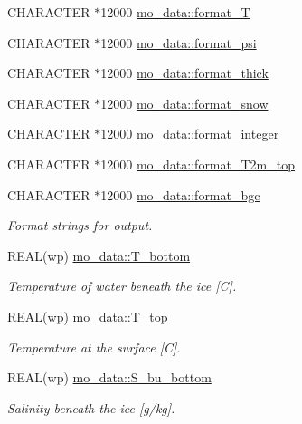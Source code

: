 \begin{DoxyCompactItemize}
CHARACTER $\ast$12000 \hyperlink{namespacemo__data_abe2cc97e4da609edede5040d2574b93f}{mo\_\-data::format\_\-T}
\item 
CHARACTER $\ast$12000 \hyperlink{namespacemo__data_a5a4d1d7b7cad308de5f2a051715e95d5}{mo\_\-data::format\_\-psi}
\item 
CHARACTER $\ast$12000 \hyperlink{namespacemo__data_acb2cd425e31735f68ad118da5eed1392}{mo\_\-data::format\_\-thick}
\item 
CHARACTER $\ast$12000 \hyperlink{namespacemo__data_ad94f3b5a63bb78de820fe5a8c6f5574c}{mo\_\-data::format\_\-snow}
\item 
CHARACTER $\ast$12000 \hyperlink{namespacemo__data_a6e3f24460d266c05576103895a7167be}{mo\_\-data::format\_\-integer}
\item 
CHARACTER $\ast$12000 \hyperlink{namespacemo__data_a15b8dd299b9b9a34d337f74ea3e8b676}{mo\_\-data::format\_\-T2m\_\-top}
\item 
CHARACTER $\ast$12000 \hyperlink{namespacemo__data_ac2bdb68249acc513c69fb2793f6f376c}{mo\_\-data::format\_\-bgc}
\begin{DoxyCompactList}\small\item\em Format strings for output. \item\end{DoxyCompactList}\item 
REAL(wp) \hyperlink{namespacemo__data_a2ac8e0a672ebfd49781702474bf4ba0e}{mo\_\-data::T\_\-bottom}
\begin{DoxyCompactList}\small\item\em Temperature of water beneath the ice \mbox{[}C\mbox{]}. \item\end{DoxyCompactList}\item 
REAL(wp) \hyperlink{namespacemo__data_abefbe1cf82237d7380ba0d7de788a07a}{mo\_\-data::T\_\-top}
\begin{DoxyCompactList}\small\item\em Temperature at the surface \mbox{[}C\mbox{]}. \item\end{DoxyCompactList}\item 
REAL(wp) \hyperlink{namespacemo__data_ad14bbccac75eb3a3d95f57d0ecb81816}{mo\_\-data::S\_\-bu\_\-bottom}
\begin{DoxyCompactList}\small\item\em Salinity beneath the ice \mbox{[}g/kg\mbox{]}. \item\end{DoxyCompactList}\item 

\end{DoxyCompactItemize}

